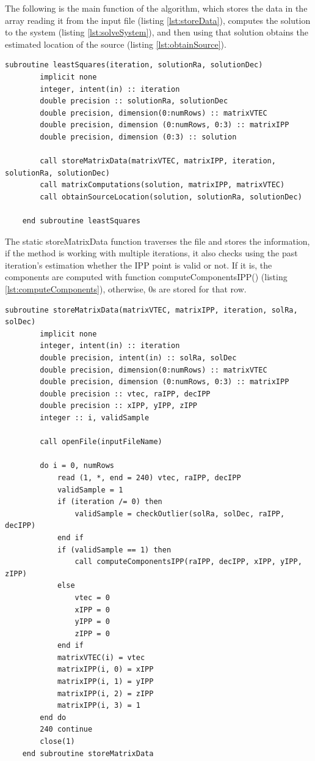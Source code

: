 The following is the main function of the algorithm, which stores the data in the array reading it from the input file (listing \ref{lst:storeData}), computes the solution to the system (listing \ref{lst:solveSystem}), and then using that solution obtains the estimated location of the source (listing \ref{lst:obtainSource}). \\

\begin{minipage}{\linewidth}
	\label{lst:main}
	\begin{lstlisting}[style=myFortranStyle, caption=Main Least Squares function]
	subroutine leastSquares(iteration, solutionRa, solutionDec)
		implicit none
		integer, intent(in) :: iteration
		double precision :: solutionRa, solutionDec
		double precision, dimension(0:numRows) :: matrixVTEC
		double precision, dimension (0:numRows, 0:3) :: matrixIPP
		double precision, dimension (0:3) :: solution
		
		call storeMatrixData(matrixVTEC, matrixIPP, iteration, solutionRa, solutionDec)
		call matrixComputations(solution, matrixIPP, matrixVTEC)
		call obtainSourceLocation(solution, solutionRa, solutionDec)
	
	end subroutine leastSquares\end{lstlisting}
\end{minipage}

\clearpage

The static storeMatrixData function traverses the file and stores the information, if the method is working with multiple iterations, it also checks using the past iteration's estimation whether the IPP point is valid or not. If it is, the components are computed with function computeComponentsIPP() (listing \ref{lst:computeComponents}), otherwise, 0s are stored for that row.

\begin{minipage}{\linewidth}
	\label{lst:storeData}
	\begin{lstlisting}[style=myFortranStyle, caption=Storing the data from the input file]
	subroutine storeMatrixData(matrixVTEC, matrixIPP, iteration, solRa, solDec)
		implicit none
		integer, intent(in) :: iteration
		double precision, intent(in) :: solRa, solDec
		double precision, dimension(0:numRows) :: matrixVTEC
		double precision, dimension (0:numRows, 0:3) :: matrixIPP
		double precision :: vtec, raIPP, decIPP
		double precision :: xIPP, yIPP, zIPP
		integer :: i, validSample
		
		call openFile(inputFileName)
		
		do i = 0, numRows
			read (1, *, end = 240) vtec, raIPP, decIPP
			validSample = 1
			if (iteration /= 0) then
				validSample = checkOutlier(solRa, solDec, raIPP, decIPP)
			end if
			if (validSample == 1) then
				call computeComponentsIPP(raIPP, decIPP, xIPP, yIPP, zIPP)
			else
				vtec = 0
				xIPP = 0
				yIPP = 0
				zIPP = 0
			end if
			matrixVTEC(i) = vtec
			matrixIPP(i, 0) = xIPP
			matrixIPP(i, 1) = yIPP
			matrixIPP(i, 2) = zIPP
			matrixIPP(i, 3) = 1
		end do
		240 continue
		close(1)
	end subroutine storeMatrixData\end{lstlisting}
\end{minipage}

